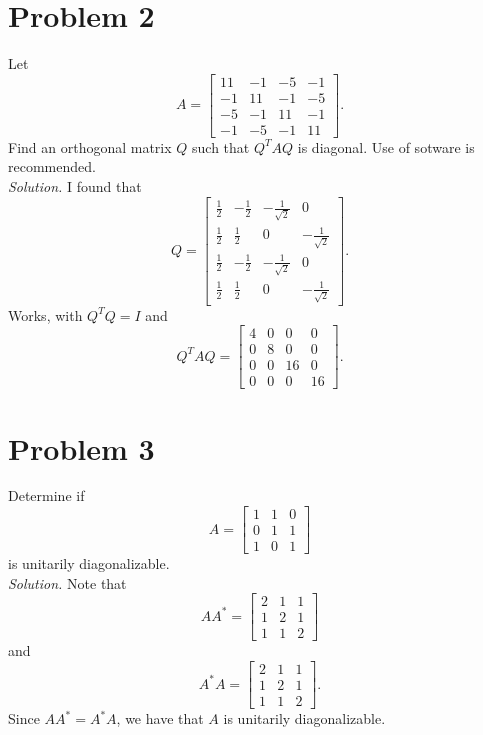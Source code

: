 \documentclass[12pt]{article}
\begin{document}
\section*{Problem 2}
Let
\[
    A=
    \begin{bmatrix}
        11&-1&-5&-1\\
        -1&11&-1&-5\\
        -5&-1&11&-1\\
        -1&-5&-1&11
    \end{bmatrix}.
\]
Find an orthogonal matrix $Q$ such that $Q^TAQ$ is diagonal. Use of sotware is recommended.\\
\textit{Solution.} I found that
\[
    Q=
    \begin{bmatrix}
        \frac{1}{2}&-\frac{1}{2}&-\frac{1}{\sqrt{2}}&0\\
        \frac{1}{2}&\frac{1}{2}&0&-\frac{1}{\sqrt{2}}\\
        \frac{1}{2}&-\frac{1}{2}&-\frac{1}{\sqrt{2}}&0\\
        \frac{1}{2}&\frac{1}{2}&0&-\frac{1}{\sqrt{2}}
    \end{bmatrix}.
\]
Works, with $Q^TQ=I$ and
\[
    Q^TAQ=
    \begin{bmatrix}
        4&0&0&0\\
        0&8&0&0\\
        0&0&16&0\\
        0&0&0&16
    \end{bmatrix}.
\]

\section*{Problem 3}
Determine if
\[
    A=
    \begin{bmatrix}
        1&1&0\\
        0&1&1\\
        1&0&1
    \end{bmatrix}
\]
is unitarily diagonalizable.\\
\textit{Solution.} Note that 
\[
    AA^\ast=
    \begin{bmatrix}
        2&1&1\\
        1&2&1\\
        1&1&2
    \end{bmatrix}
\]
and
\[
    A^\ast A=
    \begin{bmatrix}
        2&1&1\\
        1&2&1\\
        1&1&2
    \end{bmatrix}.
\]
Since $AA^\ast=A^\ast A$, we have that $A$ is unitarily diagonalizable. 
\end{document}
